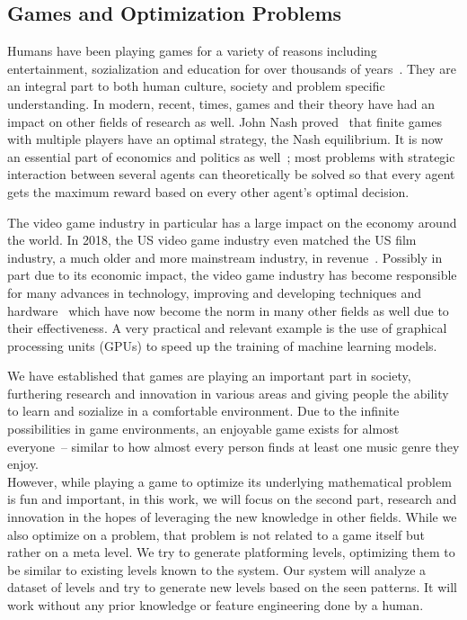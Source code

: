 \subsection{Games and Optimization Problems}

Humans have been playing games for a variety of reasons including
entertainment, sozialization and education for over thousands of
years~\cite{HistoryGames2019}. They are an integral part to both human
culture, society and problem specific understanding. In modern,
recent, times, games and their theory have had an impact on other
fields of research as well. John Nash
proved~\cite{NashEquilibrium2019} that finite games with multiple
players have an optimal strategy, the Nash equilibrium. It is now an
essential part of economics and politics as
well~\cite{NashEquilibrium2019}; most problems with strategic
interaction between several agents can theoretically be solved so that
every agent gets the maximum reward based on every other agent's
optimal decision.

The video game industry in particular has a large impact on the
economy around the world. In 2018, the US video game industry even
matched the US film industry, a much older and more mainstream
industry, in revenue~\cite{VideoGameIndustry2019}. Possibly in part
due to its economic impact, the video game industry has become
responsible for many advances in technology, improving and developing
techniques and hardware~\cite{VideoGameIndustry2019} which have now
become the norm in many other fields as well due to their
effectiveness. A very practical and relevant example is the use of
graphical processing units (GPUs) to speed up the training of machine
learning models.

We have established that games are playing an important part in
society, furthering research and innovation in various areas and
giving people the ability to learn and sozialize in a comfortable
environment. Due to the infinite possibilities in game environments,
an enjoyable game exists for almost everyone~-- similar to how almost
every person finds at least one music genre they enjoy. \\
However, while playing a game to optimize its underlying mathematical
problem is fun and important, in this work, we will focus on the
second part, research and innovation in the hopes of leveraging the
new knowledge in other fields. While we also optimize on a problem,
that problem is not related to a game itself but rather on a meta
level. We try to generate platforming levels, optimizing them to be
similar to existing levels known to the system. Our system will
analyze a dataset of levels and try to generate new levels based on
the seen patterns. It will work without any prior knowledge or feature
engineering done by a human.



